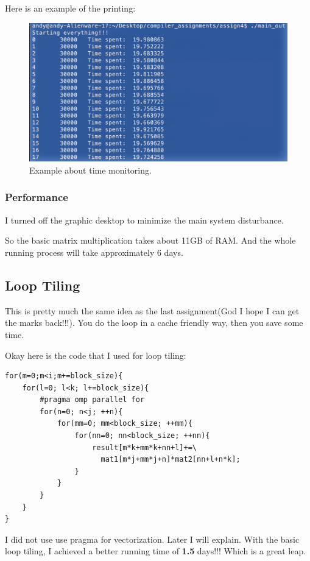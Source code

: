 \documentclass[11pt]{article}
\begin{document}
Here is an example of the printing:

\begin{figure}[htb]
\centering
\includegraphics[width=.9\linewidth]{./example.png}
\caption{\label{fig:orgparagraph1}
Example about time monitoring.}
\end{figure}



\subsubsection{Performance}
\label{sec:orgheadline3}
I turned off the graphic desktop to minimize the main system disturbance. 

So the basic matrix multiplication takes about 11GB of RAM. And the whole running process will take approximately 6 days.

\subsection{Loop Tiling}
\label{sec:orgheadline5}
This is pretty much the same idea as the last assignment(God I hope I can get the marks back!!!). You do the loop in a cache friendly way, 
then you save some time. 

Okay here is the code that I used for loop tiling:

\begin{verbatim}
for(m=0;m<i;m+=block_size){
    for(l=0; l<k; l+=block_size){
        #pragma omp parallel for
        for(n=0; n<j; ++n){
            for(mm=0; mm<block_size; ++mm){
                for(nn=0; nn<block_size; ++nn){
                    result[m*k+mm*k+nn+l]+=\
                      mat1[m*j+mm*j+n]*mat2[nn+l+n*k];    
                }
            }
        }
    }
}
\end{verbatim}

I did not use use pragma for vectorization. Later I will explain. With the basic loop tiling, I achieved a better running time of \textbf{1.5} days!!!
Which is a great leap. 
\end{document}
